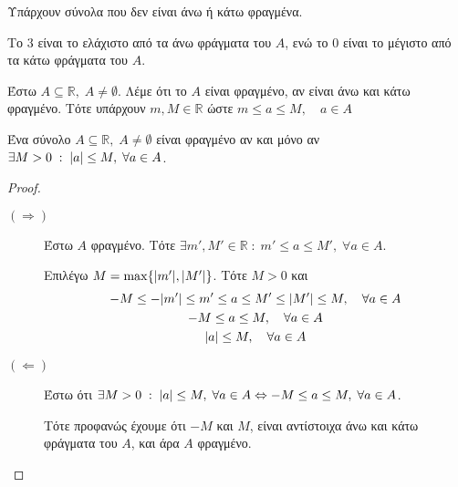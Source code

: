 \documentclass[main.tex]{subfiles}
\begin{document}
\begin{rem}
\item {}
  \begin{myitemize}
    \item Υπάρχουν σύνολα που δεν είναι άνω ή κάτω φραγμένα.
    \item Το  $ 3 $ είναι το ελάχιστο από τα άνω φράγματα του $A$, ενώ το $ 0
      $ είναι το μέγιστο από τα κάτω φράγματα του $A$. 
  \end{myitemize}
\end{rem}


\begin{mydfnbox}
  Έστω $ A \subseteq \mathbb{R}, \; A \neq \emptyset $. Λέμε ότι το $A$ 
  είναι φραγμένο, αν είναι άνω και κάτω φραγμένο. 
  Τότε υπάρχουν $ m,M \in \mathbb{R} $ ώστε $ m \leq a \leq M, \quad a \in A $ 
\end{mydfnbox}

\begin{mypropbox}
  Ένα σύνολο $ A \subseteq \mathbb{R}, \; A \neq \emptyset $ είναι 
  φραγμένο αν και μόνο αν $ \exists M>0 \; : \; \abs{a} \leq M, \; 
  \forall a \in A$.
\end{mypropbox}
\begin{proof}
\item {}
  \begin{description}
    \item [$ (\Rightarrow) $] Έστω $A$ φραγμένο. Τότε 
      $ \exists m',M' \in \mathbb{R} \; : \; m' \leq a \leq M', \; 
      \forall a \in A $.

      Επιλέγω $ M = \max \{ \abs{m'}, \abs{M'} \} $. Τότε $ M >0 $ και 
      \begin{gather*}
        -M \leq - \abs{m'} \leq m' \leq a \leq M' \leq \abs{M'} 
        \leq M, \quad \forall a \in A \\
        -M \leq a \leq M, \quad \forall a \in A \\
        \abs{a} \leq M, \quad \forall a \in A
      \end{gather*}

    \item [$ (\Leftarrow) $]
      Έστω ότι $ \exists M>0 \; : \; \abs{a} \leq M, \; \forall a \in 
      A \Leftrightarrow -M \leq a \leq M, \; \forall a \in A$. 

      Τότε προφανώς έχουμε ότι $-M $ και $ M $, 
      είναι αντίστοιχα άνω και κάτω φράγματα του $A$, και άρα $A$ 
      φραγμένο.
  \end{description} 
\end{proof}
\end{document}

